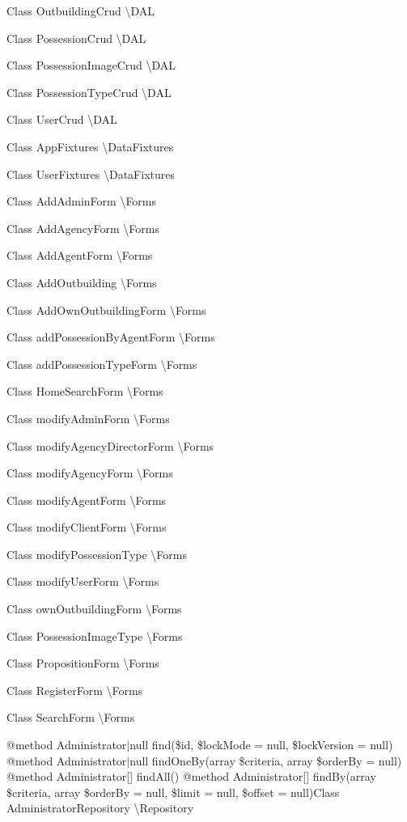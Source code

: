 Class Outbuilding\+Crud \textbackslash{}\+D\+AL

Class Possession\+Crud \textbackslash{}\+D\+AL

Class Possession\+Image\+Crud \textbackslash{}\+D\+AL

Class Possession\+Type\+Crud \textbackslash{}\+D\+AL

Class User\+Crud \textbackslash{}\+D\+AL

Class App\+Fixtures \textbackslash{}\+Data\+Fixtures

Class User\+Fixtures \textbackslash{}\+Data\+Fixtures

Class Add\+Admin\+Form \textbackslash{}\+Forms

Class Add\+Agency\+Form \textbackslash{}\+Forms

Class Add\+Agent\+Form \textbackslash{}\+Forms

Class Add\+Outbuilding \textbackslash{}\+Forms

Class Add\+Own\+Outbuilding\+Form \textbackslash{}\+Forms

Class add\+Possession\+By\+Agent\+Form \textbackslash{}\+Forms

Class add\+Possession\+Type\+Form \textbackslash{}\+Forms

Class Home\+Search\+Form \textbackslash{}\+Forms

Class modify\+Admin\+Form \textbackslash{}\+Forms

Class modify\+Agency\+Director\+Form \textbackslash{}\+Forms

Class modify\+Agency\+Form \textbackslash{}\+Forms

Class modify\+Agent\+Form \textbackslash{}\+Forms

Class modify\+Client\+Form \textbackslash{}\+Forms

Class modify\+Possession\+Type \textbackslash{}\+Forms

Class modify\+User\+Form \textbackslash{}\+Forms

Class own\+Outbuilding\+Form \textbackslash{}\+Forms

Class Possession\+Image\+Type \textbackslash{}\+Forms

Class Proposition\+Form \textbackslash{}\+Forms

Class Register\+Form \textbackslash{}\+Forms

Class Search\+Form \textbackslash{}\+Forms

@method Administrator$\vert$null find(\$id, \$lock\+Mode = null, \$lock\+Version = null) @method Administrator$\vert$null find\+One\+By(array \$criteria, array \$order\+By = null) @method Administrator\mbox{[}\mbox{]} find\+All() @method Administrator\mbox{[}\mbox{]} find\+By(array \$criteria, array \$order\+By = null, \$limit = null, \$offset = null)Class Administrator\+Repository \textbackslash{}\+Repository

